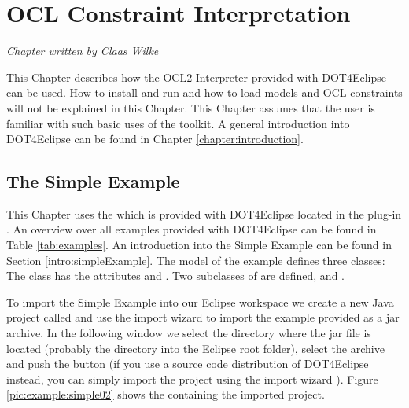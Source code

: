 \chapter{OCL Constraint Interpretation}
\label{chapter:interpretation}

\begin{flushright}
\textit{Chapter written by Claas Wilke}
\end{flushright}

This Chapter describes how the \acs{OCL}2 Interpreter provided with \acl{DOT4Eclipse} can be used. How to install and run  and how to load models and OCL constraints will not be explained in this Chapter. This Chapter assumes that the user is familiar with such basic uses of the toolkit. A general introduction into \acl{DOT4Eclipse} can be found in Chapter \ref{chapter:introduction}.




\section{The Simple Example}

This Chapter uses the  which is provided with \acl{DOT4Eclipse} located in the plug-in . An overview over all examples provided with \acl{DOT4Eclipse} can be found in Table \ref{tab:examples}. An introduction into the Simple Example can be found in Section \ref{intro:simpleExample}. The model of the example defines three classes: The class  has the attributes  and . Two subclasses of  are defined,  and .

To import the Simple Example into our Eclipse workspace we create a new Java project called  and use the import wizard  to import the example provided as a jar archive. In the following window we select the directory where the jar file is located (probably the  directory into the Eclipse root folder), select the archive  and push the  button (if you use a source code distribution of \acl{DOT4Eclipse} instead, you can simply import the project  using the import wizard ). Figure \ref{pic:example:simple02} shows the  containing the imported project.


